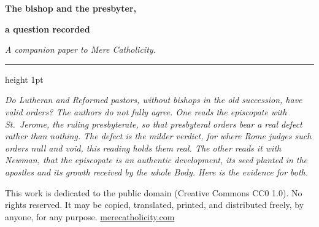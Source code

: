 \documentclass[11pt,letterpaper]{article}
\begin{document}
\color{ink}

\begin{center}
{\LARGE\bfseries\color{heading} The bishop and the presbyter,\par}
\vspace{0.3em}
{\LARGE\bfseries\color{heading} a question recorded\par}
\vspace{0.8em}
{\itshape\color{subhead} A companion paper to Mere Catholicity.\par}
\vspace{0.5em}
{\color{accent}\hrule height 1pt}
\end{center}
\vspace{1em}

\noindent\emph{Do Lutheran and Reformed pastors, without bishops in the
old succession, have valid orders? The authors do not fully agree. One
reads the episcopate with St.\ Jerome, the ruling presbyterate, so that
presbyteral orders bear a real defect rather than nothing. The defect is
the milder verdict, for where Rome judges such orders null and void,
this reading holds them real. The other reads it with Newman, that the episcopate
is an authentic development, its seed planted in the apostles and its
growth received by the whole Body. Here is the evidence for both.}

\medskip



\vspace{2em}
{\small\noindent This work is dedicated to the public domain (Creative
Commons CC0 1.0). No rights reserved. It may be copied, translated,
printed, and distributed freely, by anyone, for any purpose.
\href{https://merecatholicity.com}{merecatholicity.com}\par}
\end{document}
